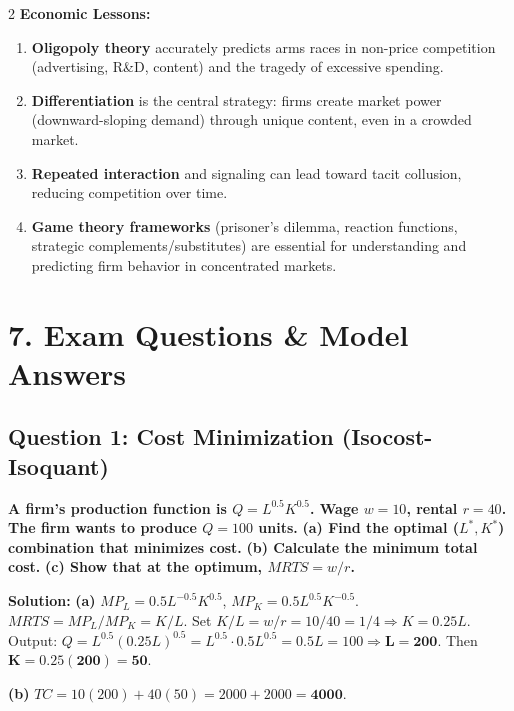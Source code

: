 \documentclass[10pt,a4paper]{article}
\begin{document}
\begin{multicols}{2}
\textbf{Economic Lessons:}
\begin{enumerate}[leftmargin=*,nosep]
    \item \textbf{Oligopoly theory} accurately predicts arms races in non-price competition (advertising, R\&D, content) and the tragedy of excessive spending.
    \item \textbf{Differentiation} is the central strategy: firms create market power (downward-sloping demand) through unique content, even in a crowded market.
    \item \textbf{Repeated interaction} and signaling can lead toward tacit collusion, reducing competition over time.
    \item \textbf{Game theory frameworks} (prisoner's dilemma, reaction functions, strategic complements/substitutes) are essential for understanding and predicting firm behavior in concentrated markets.
\end{enumerate}

\columnbreak

\section*{7. Exam Questions \& Model Answers}

\subsection*{Question 1: Cost Minimization (Isocost-Isoquant)}
\textbf{A firm's production function is $Q = L^{0.5} K^{0.5}$. Wage $w = 10$, rental $r = 40$. The firm wants to produce $Q = 100$ units.}
\textbf{(a) Find the optimal ($L^*, K^*$) combination that minimizes cost.}
\textbf{(b) Calculate the minimum total cost.}
\textbf{(c) Show that at the optimum, $MRTS = w/r$.}

\vspace{0.05cm}
\textbf{Solution:}
\vspace{0.05cm}
\textbf{(a)} $MP_L = 0.5 L^{-0.5} K^{0.5}$, $MP_K = 0.5 L^{0.5} K^{-0.5}$.
$MRTS = MP_L/MP_K = K/L$. Set $K/L = w/r = 10/40 = 1/4 \Rightarrow K = 0.25L$.
Output: $Q = L^{0.5} (0.25L)^{0.5} = L^{0.5} \cdot 0.5 L^{0.5} = 0.5L = 100 \Rightarrow \mathbf{L=200}$. Then $\mathbf{K = 0.25(200) = 50}$.

\textbf{(b)} $TC = 10(200) + 40(50) = 2000 + 2000 = \mathbf{4000}$.


\end{multicols}
\end{document}
